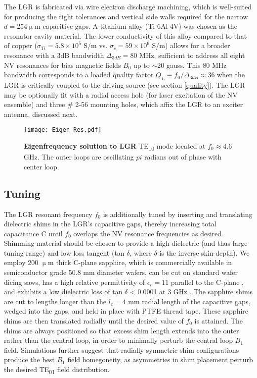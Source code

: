 The LGR is fabricated via wire electron discharge machining, which is well-suited for producing the tight tolerances and vertical side walls required for the narrow $d = 254 \upmu$m capacitive gaps. A titanium alloy (Ti-6Al-4V) was chosen as the resonator cavity material. The lower conductivity of this alloy compared to that of copper ($\sigma_{Ti} = 5.8 \times 10^{5}$ S/m vs. $\sigma_c = 59 \times 10^6$ S/m) allows for a broader resonance with a 3dB bandwidth $\Delta_{3dB} = 80$ MHz, sufficient to address all eight NV resonances for bias magnetic fields $B_0$ up to $\sim 20$ gauss. This 80 MHz bandwidth corresponds to a loaded quality factor $Q_L \equiv f_0/\Delta_{3dB} \approx 36$ when the LGR
is critically coupled to the driving source (see section \ref{quality}). The LGR may be optionally fit with a radial access hole (for laser excitation of the NV ensemble) and three \# 2-56 mounting holes, which affix the LGR to an exciter antenna, discussed next.

\begin{figure}[h!]
\centering
\texttt{[image: Eigen\_Res.pdf]}  
\caption{\textbf{Eigenfrequency solution to LGR} TE\textsubscript{10} mode located at $f_0 \approx 4.6$ GHz. The outer loops are oscillating $pi$ radians out of phase with center loop.}
\label{LGR_Eigen}
\end{figure}


\subsection{Tuning} \label{tuning}

The LGR resonant frequency $f_0$ is additionally tuned by inserting
and translating dielectric shims in the LGR's capacitive
gaps, thereby increasing total capacitance C until $f_0$ overlaps the NV resonance frequencies as desired. Shimming material should be chosen to provide a high dielectric (and thus large tuning range) and low loss tangent (tan $\delta$, where $\delta$ is the inverse skin-depth). We employ 200 $\upmu$m thick C-plane sapphire, which is commercially
available in semiconductor grade 50.8 mm diameter wafers, can be cut on standard wafer dicing saws, has a high relative permittivity of $\epsilon_r = 11$ parallel to the C-plane \cite{westphal1972dielectric}, and exhibits a low dielectric loss of tan $\delta$ < 0.0001 at 3 GHz \cite{westphal1972dielectric, hartnett2006sapphireshim}. The sapphire shims are cut to lengths longer than the $l_c = 4$ mm radial length of the capacitive gaps, wedged into the gaps, and held in place with PTFE thread tape. These sapphire shims are then translated radially until the desired value of $f_0$ is attained. The shims are always positioned so that excess shim length extends into the outer rather than the central loop, in order to minimally perturb the central loop $B_1$ field. Simulations further suggest that radially symmetric shim configurations produce the best $B_1$ field homegoneity, as asymmetries in shim placement perturb the desired TE\textsubscript{01} field distribution. 



